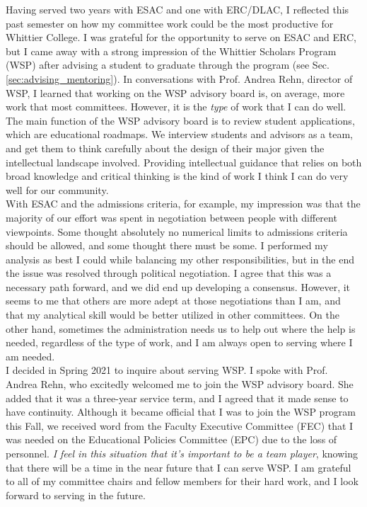 \documentclass[../../../main.tex]{subfiles}
\begin{document}
Having served two years with ESAC and one with ERC/DLAC, I reflected this past semester on how my committee work could be the most productive for Whittier College.  I was grateful for the opportunity to serve on ESAC and ERC, but I came away with a strong impression of the Whittier Scholars Program (WSP) after advising a student to graduate through the program (see Sec. \ref{sec:advising_mentoring}).  In conversations with Prof. Andrea Rehn, director of WSP, I learned that working on the WSP advisory board is, on average, more work that most committees.  However, it is the \textit{type} of work that I can do well.  The main function of the WSP advisory board is to review student applications, which are educational roadmaps.  We interview students and advisors as a team, and get them to think carefully about the design of their major given the intellectual landscape involved.  Providing intellectual guidance that relies on both broad knowledge and critical thinking is the kind of work I think I can do very well for our community.
\\
\vspace{0.25cm}
With ESAC and the admissions criteria, for example, my impression was that the majority of our effort was spent in negotiation between people with different viewpoints.  Some thought absolutely no numerical limits to admissions criteria should be allowed, and some thought there must be some.  I performed my analysis as best I could while balancing my other responsibilities, but in the end the issue was resolved through political negotiation.  I agree that this was a necessary path forward, and we did end up developing a consensus.  However, it seems to me that others are more adept at those negotiations than I am, and that my analytical skill would be better utilized in other committees.  On the other hand, sometimes the administration needs us to help out where the help is needed, regardless of the type of work, and I am always open to serving where I am needed.
\\
\vspace{0.25cm}
I decided in Spring 2021 to inquire about serving WSP.  I spoke with Prof. Andrea Rehn, who excitedly welcomed me to join the WSP advisory board.  She added that it was a three-year service term, and I agreed that it made sense to have continuity.  Although it became official that I was to join the WSP program this Fall, we received word from the Faculty Executive Committee (FEC) that I was needed on the Educational Policies Committee (EPC) due to the loss of personnel.  \textit{I feel in this situation that it's important to be a team player}, knowing that there will be a time in the near future that I can serve WSP.  I am grateful to all of my committee chairs and fellow members for their hard work, and I look forward to serving in the future.
\end{document}
